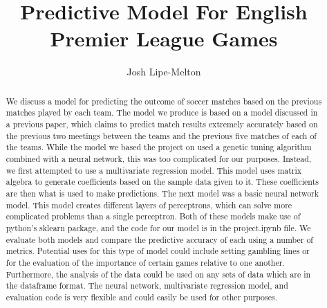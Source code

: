 \documentclass[sigconf]{acmart}
\begin{document}
\title{Predictive Model For English Premier League Games}
\author{Josh Lipe-Melton}

\renewcommand{\shortauthors}{J. Lipe-Melton}

\begin{abstract}
We discuss a model for predicting the outcome of soccer matches based on the previous matches played by each team. The model we produce is based on a model discussed in a previous paper, which claims to predict match results extremely accurately based on the previous two meetings between the teams and the previous five matches of each of the teams. While the model we based the project on used a genetic tuning algorithm combined with a neural network, this was too complicated for our purposes. Instead, we first attempted to use a multivariate regression model. This model uses matrix algebra to generate coefficients based on the sample data given to it. These coefficients are then what is used to make predictions. The next model was a basic neural network model. This model creates different layers of perceptrons, which can solve more complicated problems than a single perceptron. Both of these models make use of python's sklearn package, and the code for our model is in the project.ipynb file. We evaluate both models and compare the predictive accuracy of each using a number of metrics. Potential uses for this type of model could include setting gambling lines or for the evaluation of the importance of certain games relative to one another. Furthermore, the analysis of the data could be used on any sets of data which are in the dataframe format. The neural network, multivariate regression model, and evaluation code is very flexible and could easily be used for other purposes.
\end{abstract}


\maketitle
\end{document}
